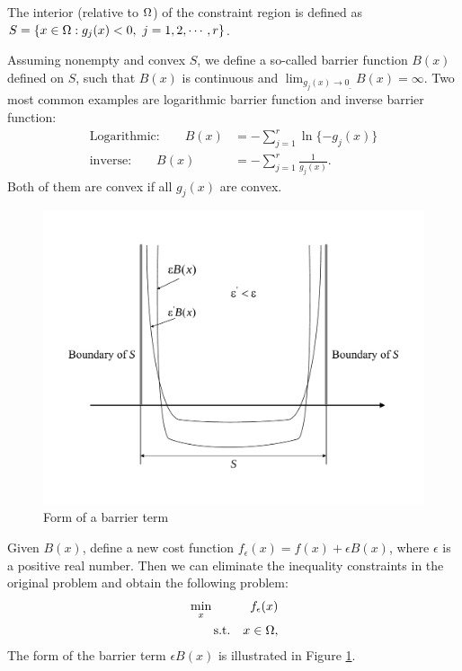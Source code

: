 \begin{definition}
The interior (relative to $\Omega$) of the constraint region is defined as $S=\{x\in\domain:g_j(x)<0,\ j=1,2,\cdots,r\}$. 

Assuming nonempty and convex $S$, we define a so-called barrier function $B(x)$ defined on $S$, such that $B(x)$ is continuous and $\lim_{g_j(x)\rightarrow{0_{\_}}}B(x)=\infty$. Two most common examples are logarithmic barrier function and inverse barrier function: 
\begin{align}
\text{Logarithmic:}\qquad B(x) &= -\sum_{j=1}^{r}\ln\{-g_j(x)\}\\
\text{inverse:}\qquad B(x) &= -\sum_{j=1}^{r}\frac{1}{g_j(x)}.
\end{align}
Both of them are convex if all $g_j(x)$ are convex. 

\begin{figure}[ht]
\centering
\includegraphics[scale=0.4]{figures/lecture25-barrier_function}
\caption{Form of a barrier term}
\label{fig:barrier}
\end{figure}

Given $B(x)$, define a new cost function $f_\epsilon(x)=f(x)+\epsilon{B(x)}$, where $\epsilon$ is a positive real number. Then we can eliminate the inequality constraints in the original problem and obtain the following problem: 
\begin{equation}
\begin{aligned}
&\min_x & {f_\epsilon(x)}\\
&\qquad\text{s.t.} & x\in{\Omega},\\
\end{aligned}
\end{equation}
The form of the barrier term $\epsilon{B(x)}$ is illustrated in Figure \ref{fig:barrier}.


\end{definition}
